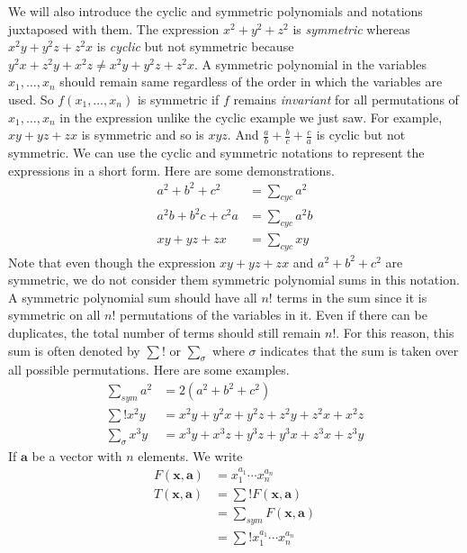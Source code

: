 \documentclass{subfile}
\begin{document}
	We will also introduce the cyclic and symmetric polynomials and notations juxtaposed with them. The expression $x^{2}+y^{2}+z^{2}$ is \textit{symmetric} whereas $x^{2}y+y^{2}z+z^{2}x$ is \textit{cyclic} but not symmetric because $y^{2}x+z^{2}y+x^{2}z\neq x^{2}y+y^{2}z+z^{2}x$. A symmetric polynomial in the variables $x_{1},\ldots,x_{n}$ should remain same regardless of the order in which the variables are used. So $f(x_{1},\ldots,x_{n})$ is symmetric if $f$ remains \textit{invariant} for all permutations of $x_{1},\ldots,x_{n}$ in the expression unlike the cyclic example we just saw. For example, $xy+yz+zx$ is symmetric and so is $xyz$. And $\frac{a}{b}+\frac{b}{c}+\frac{c}{a}$ is cyclic but not symmetric. We can use the cyclic and symmetric notations to represent the expressions in a short form. Here are some demonstrations.
		\begin{align*}
			a^{2}+b^{2}+c^{2}
				& = \sum_{cyc}a^{2}\\
			a^{2}b+b^{2}c+c^{2}a
				& = \sum_{cyc}a^{2}b\\
			xy+yz+zx
				& = \sum_{cyc}xy
		\end{align*}
	Note that even though the expression $xy+yz+zx$ and $a^{2}+b^{2}+c^{2}$ are symmetric, we do not consider them symmetric polynomial sums in this notation. A symmetric polynomial sum should have all $n!$ terms in the sum since it is symmetric on all $n!$ permutations of the variables in it. Even if there can be duplicates, the total number of terms should still remain $n!$. For this reason, this sum is often denoted by $\sum{!}$ or $\sum_{\sigma}$ where $\sigma$ indicates that the sum is taken over all possible permutations. Here are some examples.
		\begin{align*}
			\sum_{sym}a^{2}
				& = 2(a^{2}+b^{2}+c^{2})\\
			\sum{!} x^{2}y
				& = x^{2}y+y^{2}x+y^{2}z+z^{2}y+z^{2}x+x^{2}z\\
			\sum_{\sigma}x^{3}y
				& = x^{3}y+x^{3}z+y^{3}z+y^{3}x+z^{3}x+z^{3}y
		\end{align*}
	If $\mathbf{a}$ be a vector with $n$ elements. We write
		\begin{align*}
			F(\mathbf{x}, \mathbf{a})
				& = x_{1}^{a_{1}}\cdots x_{n}^{a_{n}}\\
			T(\mathbf{x},\mathbf{a})
				& = \sum{!}F(\mathbf{x},\mathbf{a})\\
				& = \sum_{sym} F(\mathbf{x},\mathbf{a})\\
				& = \sum{!}x_{1}^{a_{1}}\cdots x_{n}^{a_{n}}
		\end{align*}
\end{document}
